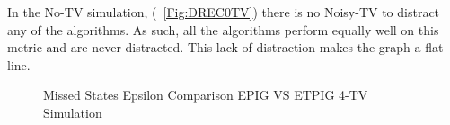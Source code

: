 \documentclass[12pt]{thesis}
\begin{document}
In the No-TV simulation, (\figurename~\ref{Fig:DREC0TV}) there is no Noisy-TV to distract any of the algorithms. As such, all the algorithms perform equally well on this metric and are never distracted. This lack of distraction makes the graph a flat line.
\begin{figure}
	\begin{center}
		\hfill
			
		\hfill
	\end{center}
	\caption{Missed States Epsilon Comparison EPIG VS ETPIG 4-TV Simulation}
	\label{Fig:EMEC4TV}
\end{figure}
\end{document}
